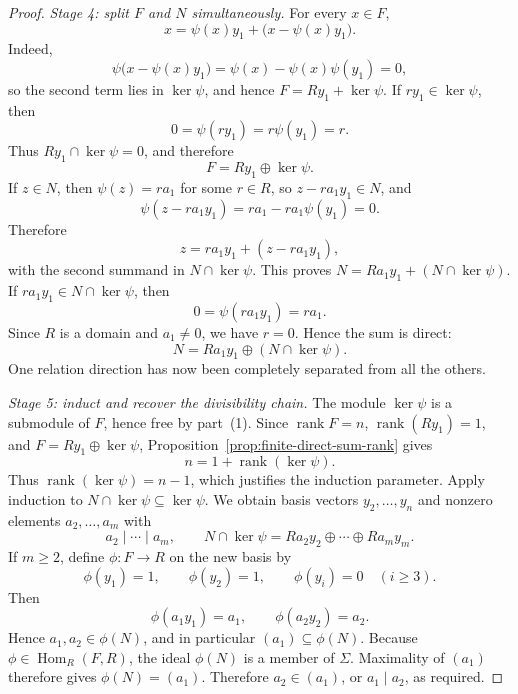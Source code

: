 \begin{proof}
\emph{Stage 4: split \(F\) and \(N\) simultaneously.}
For every \(x\in F\),
\[
x=\psi(x)y_1+\bigl(x-\psi(x)y_1\bigr).
\]
Indeed,
\[
\psi\bigl(x-\psi(x)y_1\bigr)
=\psi(x)-\psi(x)\psi(y_1)=0,
\]
so the second term lies in \(\ker\psi\), and hence
\(F=Ry_1+\ker\psi\). If \(ry_1\in\ker\psi\), then
\[
0=\psi(ry_1)=r\psi(y_1)=r.
\]
Thus \(Ry_1\cap\ker\psi=0\), and therefore
\[
F=Ry_1\oplus\ker\psi.
\]
If \(z\in N\), then \(\psi(z)=ra_1\) for some \(r\in R\), so
\(z-ra_1y_1\in N\), and
\[
\psi(z-ra_1y_1)=ra_1-ra_1\psi(y_1)=0.
\]
Therefore
\[
z=ra_1y_1+(z-ra_1y_1),
\]
with the second summand in \(N\cap\ker\psi\). This proves
\(N=Ra_1y_1+(N\cap\ker\psi)\). If
\(ra_1y_1\in N\cap\ker\psi\), then
\[
0=\psi(ra_1y_1)=ra_1.
\]
Since \(R\) is a domain and \(a_1\ne0\), we have \(r=0\). Hence the sum is
direct:
\[
N=Ra_1y_1\oplus(N\cap\ker\psi).
\]
One relation direction has now been completely separated from all the others.

\emph{Stage 5: induct and recover the divisibility chain.}
The module \(\ker\psi\) is a submodule of \(F\), hence free by part~(1).
Since \(\operatorname{rank}F=n\), \(\operatorname{rank}(Ry_1)=1\), and
\(F=Ry_1\oplus\ker\psi\),
Proposition~\ref{prop:finite-direct-sum-rank} gives
\[
n=1+\operatorname{rank}(\ker\psi).
\]
Thus \(\operatorname{rank}(\ker\psi)=n-1\), which justifies the induction
parameter. Apply induction to
\(N\cap\ker\psi\subseteq\ker\psi\).  We obtain basis vectors
\(y_2,\ldots,y_n\) and nonzero elements \(a_2,\ldots,a_m\) with
\[
a_2\mid\cdots\mid a_m,
\qquad
N\cap\ker\psi=Ra_2y_2\oplus\cdots\oplus Ra_my_m.
\]
If \(m\geq2\), define \(\phi:F\to R\) on the new basis by
\[
\phi(y_1)=1,\qquad \phi(y_2)=1,\qquad
\phi(y_i)=0\quad(i\geq3).
\]
Then
\[
\phi(a_1y_1)=a_1,
\qquad
\phi(a_2y_2)=a_2.
\]
Hence \(a_1,a_2\in\phi(N)\), and in particular
\((a_1)\subseteq\phi(N)\). Because
\(\phi\in\operatorname{Hom}_R(F,R)\), the ideal \(\phi(N)\) is a member of
\(\Sigma\). Maximality of \((a_1)\) therefore gives
\(\phi(N)=(a_1)\).
Therefore \(a_2\in(a_1)\), or \(a_1\mid a_2\), as required.
\end{proof}

